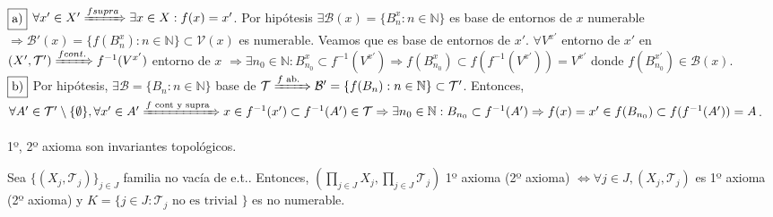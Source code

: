 \begin{dem}
  $\fbox{a)}$ $\forall x' \in X' \xRightarrow[]{ f supra} \exists x \in X : f(x) = x'$. Por hipótesis $\exists \mathcal{B} (x) = \{ B_{n}^{x} : n \in \mathbb{N} \}$ es base de entornos de $x$ numerable $\Rightarrow \mathcal{B}'(x) = \{ f(B_{n}^{x}) : n \in \mathbb{N} \} \subset \mathcal{V}(x)$ es numerable. Veamos que es base de entornos de $x'$. $\forall V^{x'}$ entorno de $ x'$ en $( X', \mathcal{T}' ) \xRightarrow[]{ f cont. } f^{-1}(V^{x'})$ entorno de $x$ $\Rightarrow \exists n_{0} \in \mathbb{N} : B_{n_{0}}^{x} \subset f^{-1}(V^{x'}) \Rightarrow f(B_{n_{0}}^{x}) \subset f(f^{-1}(V^{x'})) = V^{x'}$ donde $ f(B_{n_{0}}^{x'}) \in \mathcal{B}(x)$. \\

$\fbox{b)}$ Por hipótesis, $\exists \mathcal{B} = \{ B_{n} : n \in \mathbb{N} \}$ base de $\mathcal{T} \xRightarrow[]{f \text{ ab. }} \mathcal{B}' = \{  f(B_{n}) : n \in \mathbb{N} \} \subset \mathcal{T}'$. Entonces, $\forall A' \in \mathcal{T}' \setminus \{  \emptyset \}, \forall x' \in A' \xRightarrow[]{f \text{ cont y supra }} x \in f^{-1}(x') \subset f^{-1}(A') \in \mathcal{T} \Rightarrow \exists n_{0} \in \mathbb{N} : B_{n_{0}} \subset f^{-1}(A') \Rightarrow f(x) = x' \in f(B_{n_{0}}) \subset f( f^{-1}(A')) = A$.
\end{dem}

\begin{cor}
  1º, 2º axioma son invariantes topológicos.
\end{cor}

\begin{prop}
  Sea $\{ ( X_{j}, \mathcal{T}_{j} ) \}_{j \in J}$ familia no vacía de e.t.. Entonces, $( \prod_{j \in J} X_{j}, \prod_{j \in J} \mathcal{T}_{j} )$ 1º axioma (2º axioma) $\Leftrightarrow \forall j \in J, ( X_{j}, \mathcal{T}_{j} )$ es 1º axioma (2º axioma) y $K = \{ j \in J: \mathcal{T}_{j} \text{ no es trivial } \}$ es no numerable.
\end{prop}

